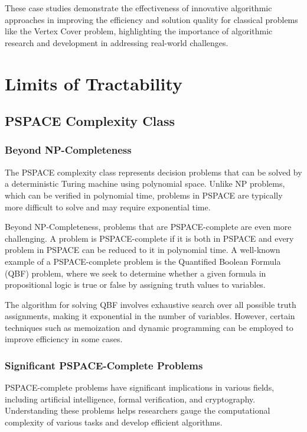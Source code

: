 \documentclass[12pt]{book} %
\begin{document}
These case studies demonstrate the effectiveness of innovative algorithmic approaches in improving the efficiency and solution quality for classical problems like the Vertex Cover problem, highlighting the importance of algorithmic research and development in addressing real-world challenges.


\section{Limits of Tractability}

\subsection{PSPACE Complexity Class}

\subsubsection{Beyond NP-Completeness}

The PSPACE complexity class represents decision problems that can be solved by a deterministic Turing machine using polynomial space. Unlike NP problems, which can be verified in polynomial time, problems in PSPACE are typically more difficult to solve and may require exponential time.

Beyond NP-Completeness, problems that are PSPACE-complete are even more challenging. A problem is PSPACE-complete if it is both in PSPACE and every problem in PSPACE can be reduced to it in polynomial time. A well-known example of a PSPACE-complete problem is the Quantified Boolean Formula (QBF) problem, where we seek to determine whether a given formula in propositional logic is true or false by assigning truth values to variables.

 The algorithm for solving QBF involves exhaustive search over all possible truth assignments, making it exponential in the number of variables. However, certain techniques such as memoization and dynamic programming can be employed to improve efficiency in some cases.

\subsubsection{Significant PSPACE-Complete Problems}

PSPACE-complete problems have significant implications in various fields, including artificial intelligence, formal verification, and cryptography. Understanding these problems helps researchers gauge the computational complexity of various tasks and develop efficient algorithms.
\end{document}
